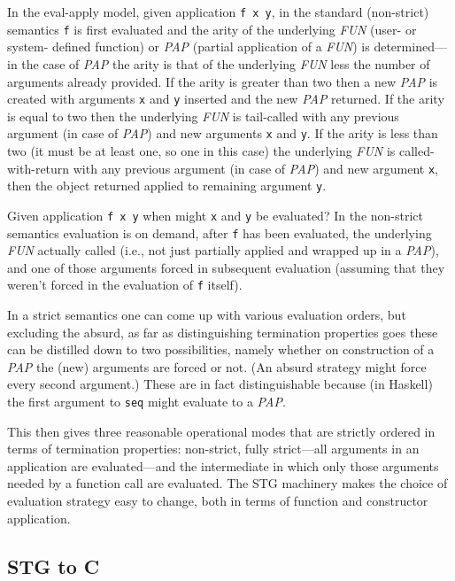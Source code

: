 \documentclass{llncs}
\begin{document}
In the eval-apply model, given application \texttt{f x y}, in the standard
(non-strict) semantics \texttt{f} is first evaluated and the arity of the
underlying \emph{FUN} (user- or system- defined function) or \emph{PAP}
(partial application of a \emph{FUN}) is determined---in the case of
\emph{PAP} the arity is that of the underlying \emph{FUN} less the number of
arguments already provided.  If the arity is greater than two then a new
\emph{PAP} is created with arguments \texttt{x} and \texttt{y} inserted and
the new \emph{PAP} returned.  If the arity is equal to two then the underlying
\emph{FUN} is tail-called with any previous argument (in case of \emph{PAP})
and new arguments \texttt{x} and \texttt{y}.  If the arity is less than two
(it must be at least one, so one in this case) the underlying \emph{FUN} is
called-with-return with any previous argument (in case of \emph{PAP}) and new
argument \texttt{x}, then the object returned applied to remaining argument
\texttt{y}.

Given application \texttt{f x y} when might \texttt{x} and \texttt{y} be
evaluated?  In the non-strict semantics evaluation is on demand, after
\texttt{f} has been evaluated, the underlying \emph{FUN} actually called
(i.e., not just partially applied and wrapped up in a \emph{PAP}), and one of
those arguments forced in subsequent evaluation (assuming that they weren't
forced in the evaluation of \texttt{f} itself).

In a strict semantics one can come up with various evaluation orders, but
excluding the absurd, as far as distinguishing termination properties goes
these can be distilled down to two possibilities, namely whether on
construction of a \emph{PAP} the (new) arguments are forced or not.  (An
absurd strategy might force every second argument.)  These are in fact
distinguishable because (in Haskell) the first argument to \texttt{seq} might
evaluate to a \emph{PAP}.

This then gives three reasonable operational modes that are strictly ordered
in terms of termination properties: non-strict, fully strict---all arguments
in an application are evaluated---and the intermediate in which only those
arguments needed by a function call are evaluated.  The STG machinery makes
the choice of evaluation strategy easy to change, both in terms of function
and constructor application.

\subsection{STG to C}
\end{document}
